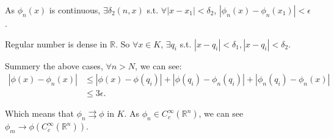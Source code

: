 \documentclass[a4paper]{ctexart}
\begin{document}
As $\phi_{n}(x)$ is continuous, $\exists \delta_{2}(n,x)$ s.t. $\forall |x-x_{1}|<\delta_{2}$, $|\phi_{n}(x)-\phi_{n}(x_{1})|<\epsilon$.

Regular number is dense in $\mathbb{R}$. So $\forall x\in K$, $\exists q_{i}$ s.t. $|x-q_{i}|<\delta_{1},|x-q_{i}|<\delta_{2}$.

Summery the above cases, $\forall n>N$, we can see:
\begin{equation}
    \begin{aligned}
        |\phi(x)-\phi_{n}(x)|&\le|\phi(x)-\phi(q_{i})|+|\phi(q_{i})-\phi_{n}(q_{i})|+|\phi_{n}(q_{i})-\phi_{n}(x)|\\
        &\le 3\epsilon.
    \end{aligned}
\end{equation}

Which means that $\phi_{n}\rightrightarrows\phi$ in $K$. As $\phi_{n}\in C_{c}^{\infty}(\mathbb{R}^{n})$, we can see $\phi_{m}\rightarrow\phi(C_{c}^{\infty}(\mathbb{R}^{n}))$.
\end{document}
